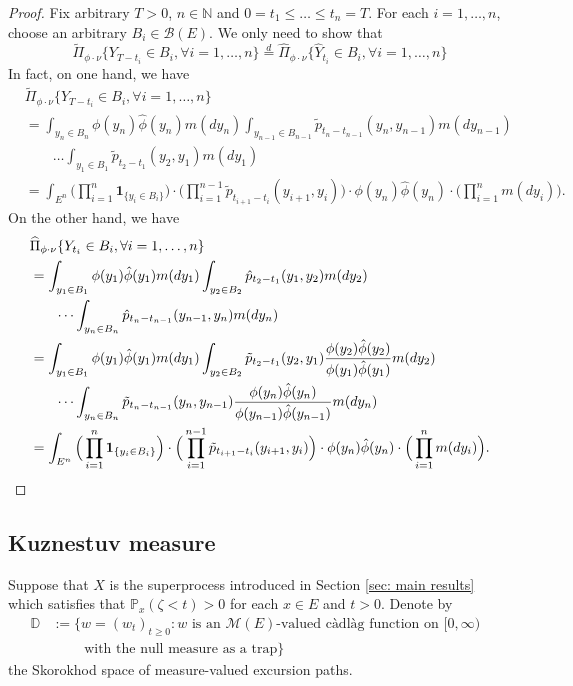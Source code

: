 \documentclass[12pt,a4paper]{amsart}
\theoremstyle{plain}
\theoremstyle{definition}
\numberwithin{equation}{section}
\begin{document}
\begin{proof}
	Fix arbitrary $T>0$, $n \in \mathbb N$ and $0= t_1\leq \dots \leq t_n = T$.
	For each $i=1,\dots, n$, choose an arbitrary $B_i \in \mathscr B(E)$.
	We only need to show that
\[
	\widetilde \Pi_{\phi \cdot \nu}\{Y_{T-t_i}\in B_i,\forall i=1,\dots, n\}
	\overset{d}{=}\widehat \Pi_{\phi \cdot \nu}\{\hat Y_{t_i}\in B_i,\forall i=1,\dots, n\}
\]
	In fact, on one hand, we have
\begin{align}
	&\widetilde \Pi_{\phi \cdot \nu}\{Y_{T-t_i}\in B_i,\forall i=1,\dots, n\}
	\\&= \int_{y_n\in B_n} \phi(y_n)\hat\phi(y_n) m(dy_n)\int_{y_{n-1}\in B_{n-1}} \tilde p_{t_n - t_{n-1}}(y_n,y_{n-1})m(dy_{n-1})
	\\& \qquad \dots \int_{y_1\in B_1} \tilde p_{t_2 - t_1}(y_2,y_1)m(dy_1)
	\\&= \int_{E^n} \Big(\prod_{i=1}^n \mathbf 1_{\{y_i\in B_i\}}\Big)\cdot\Big(\prod_{i=1}^{n-1} \tilde p_{t_{i+1}-t_i}(y_{i+1},y_i)\Big)\cdot\phi(y_n)\hat\phi(y_n)\cdot \Big(\prod_{i=1}^nm(dy_i)\Big).
\end{align}
	On the other hand, we have
\begin{align}
	&\widehat \Pi_{\phi\cdot\nu}\{Y_{t_i}\in B_i, \forall i = 1,\dots, n\}
	\\&= \int_{y_1\in B_1} \phi(y_1)\hat \phi(y_1)m(dy_1) \int_{y_2\in B_2} \hat p_{t_2-t_1}(y_1,y_2)m(dy_2)
	\\&\qquad \dots\int_{y_n\in B_n}\hat p_{t_n-t_{n-1}}(y_{n-1},y_n)m(dy_n)
	\\&= \int_{y_1\in  B_1} \phi(y_1)\hat \phi(y_1)m(dy_1) \int_{y_2\in B_2} \tilde p_{t_2-t_1}(y_2,y_1)\frac{\phi(y_2)\hat \phi(y_2)}{\phi(y_1)\hat \phi(y_1)}m(dy_2)
	\\&\qquad \dots\int_{y_n\in B_n}\tilde p_{t_n-t_{n-1}}(y_n,y_{n-1})\frac{\phi(y_n)\hat\phi(y_n)}{\phi(y_{n-1})\hat\phi(y_{n-1})}m(dy_n)
	\\&= \int_{E^n} \Big(\prod_{i=1}^n \mathbf 1_{\{y_i\in B_i\}}\Big)\cdot\Big(\prod_{i=1}^{n-1} \tilde p_{t_{i+1}-t_i}(y_{i+1},y_i)\Big)\cdot\phi(y_n)\hat\phi(y_n)\cdot \Big(\prod_{i=1}^n m(dy_i)\Big).
\qedhere
\end{align}
\end{proof}

\subsection{Kuznestuv measure}
	Suppose that $X$ is the superprocess introduced in Section \ref{sec: main results} which satisfies that $\mathbb P_{x}(\zeta < t)>0$ for each $x\in E$ and $t>0$. Denote by
\begin{align}
	\mathbb D &:=\{ w= (w_t)_{t\geq 0}: w \text{ is an $\mathcal M(E)$-valued c\`{a}dl\`{a}g function on $[0,\infty)$ }
	\\ &\qquad \text{ with the null measure as a trap} \}
\end{align}
	the Skorokhod space of measure-valued excursion paths.
\end{document}
